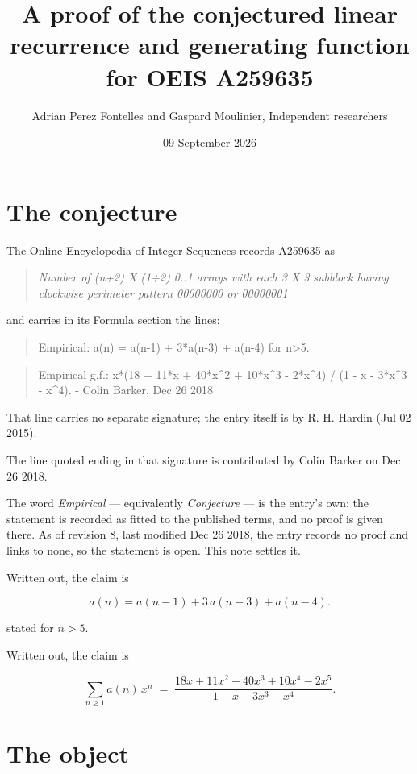 \documentclass[11pt]{article}
\title{A proof of the conjectured linear recurrence and generating function for OEIS A259635}
\author{Adrian Perez Fontelles and Gaspard Moulinier, Independent researchers}
\date{09 September 2026}
\theoremstyle{definition}
\begin{document}
\maketitle
\section{The conjecture}

The Online Encyclopedia of Integer Sequences records \href{https://oeis.org/A259635}{A259635} as

\begin{quote}\itshape Number of (n+2) X (1+2) 0..1 arrays with each 3 X 3 subblock having clockwise perimeter pattern 00000000 or 00000001\end{quote}

and carries in its Formula section the lines:

\begin{quote}\ttfamily Empirical: a(n) = a(n-1) + 3*a(n-3) + a(n-4) for n>5.\end{quote}

\begin{quote}\ttfamily Empirical g.f.: x*(18 + 11*x + 40*x\textasciicircum{}2 + 10*x\textasciicircum{}3 - 2*x\textasciicircum{}4) / (1 - x - 3*x\textasciicircum{}3 - x\textasciicircum{}4). - Colin Barker, Dec 26 2018\end{quote}

That line carries no separate signature; the entry itself is by R. H. Hardin (Jul 02 2015).

The line quoted ending in that signature is contributed by Colin Barker on Dec 26 2018.

The word {\itshape Empirical} --- equivalently {\itshape Conjecture} --- is the entry's own: the statement is recorded as fitted to the published terms, and no proof is given there. As of revision 8, last modified Dec 26 2018, the entry records no proof and links to none, so the statement is open. This note settles it.

Written out, the claim is

\[a(n) = a(n-1) + 3\,a(n-3) + a(n-4).\]

stated for $n > 5$.

Written out, the claim is

\[\sum_{n \ge 1} a(n)\,x^n \;=\; \frac{18x + 11x^{2} + 40x^{3} + 10x^{4} - 2x^{5}}{1 - x - 3x^{3} - x^{4}}.\]

\section{The object}
\end{document}
